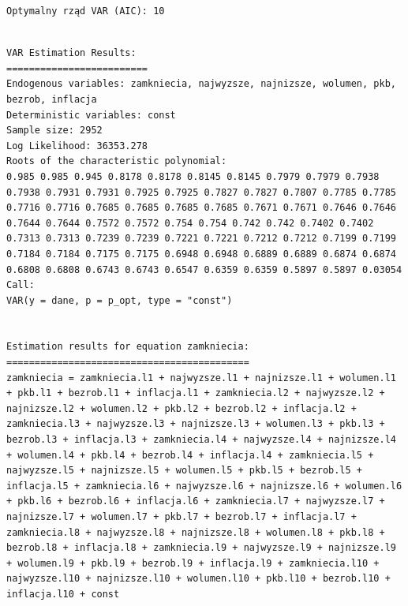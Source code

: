 \documentclass[
  polish,
  letterpaper,
  DIV=11,
  numbers=noendperiod]{scrartcl}
\newenvironment{Shaded}{\begin{snugshade}}{\end{snugshade}}
\newcommand{\FunctionTok}[1]{\textcolor[rgb]{0.28,0.35,0.67}{#1}}
\newcommand{\NormalTok}[1]{\textcolor[rgb]{0.00,0.23,0.31}{#1}}
\newcommand{\OtherTok}[1]{\textcolor[rgb]{0.00,0.23,0.31}{#1}}
\newcommand{\SpecialCharTok}[1]{\textcolor[rgb]{0.37,0.37,0.37}{#1}}
\begin{document}
\begin{verbatim}
Optymalny rząd VAR (AIC): 10 
\end{verbatim}

\begin{Shaded}
\end{Shaded}

\begin{verbatim}

VAR Estimation Results:
========================= 
Endogenous variables: zamkniecia, najwyzsze, najnizsze, wolumen, pkb, bezrob, inflacja 
Deterministic variables: const 
Sample size: 2952 
Log Likelihood: 36353.278 
Roots of the characteristic polynomial:
0.985 0.985 0.945 0.8178 0.8178 0.8145 0.8145 0.7979 0.7979 0.7938 0.7938 0.7931 0.7931 0.7925 0.7925 0.7827 0.7827 0.7807 0.7785 0.7785 0.7716 0.7716 0.7685 0.7685 0.7685 0.7685 0.7671 0.7671 0.7646 0.7646 0.7644 0.7644 0.7572 0.7572 0.754 0.754 0.742 0.742 0.7402 0.7402 0.7313 0.7313 0.7239 0.7239 0.7221 0.7221 0.7212 0.7212 0.7199 0.7199 0.7184 0.7184 0.7175 0.7175 0.6948 0.6948 0.6889 0.6889 0.6874 0.6874 0.6808 0.6808 0.6743 0.6743 0.6547 0.6359 0.6359 0.5897 0.5897 0.03054
Call:
VAR(y = dane, p = p_opt, type = "const")


Estimation results for equation zamkniecia: 
=========================================== 
zamkniecia = zamkniecia.l1 + najwyzsze.l1 + najnizsze.l1 + wolumen.l1 + pkb.l1 + bezrob.l1 + inflacja.l1 + zamkniecia.l2 + najwyzsze.l2 + najnizsze.l2 + wolumen.l2 + pkb.l2 + bezrob.l2 + inflacja.l2 + zamkniecia.l3 + najwyzsze.l3 + najnizsze.l3 + wolumen.l3 + pkb.l3 + bezrob.l3 + inflacja.l3 + zamkniecia.l4 + najwyzsze.l4 + najnizsze.l4 + wolumen.l4 + pkb.l4 + bezrob.l4 + inflacja.l4 + zamkniecia.l5 + najwyzsze.l5 + najnizsze.l5 + wolumen.l5 + pkb.l5 + bezrob.l5 + inflacja.l5 + zamkniecia.l6 + najwyzsze.l6 + najnizsze.l6 + wolumen.l6 + pkb.l6 + bezrob.l6 + inflacja.l6 + zamkniecia.l7 + najwyzsze.l7 + najnizsze.l7 + wolumen.l7 + pkb.l7 + bezrob.l7 + inflacja.l7 + zamkniecia.l8 + najwyzsze.l8 + najnizsze.l8 + wolumen.l8 + pkb.l8 + bezrob.l8 + inflacja.l8 + zamkniecia.l9 + najwyzsze.l9 + najnizsze.l9 + wolumen.l9 + pkb.l9 + bezrob.l9 + inflacja.l9 + zamkniecia.l10 + najwyzsze.l10 + najnizsze.l10 + wolumen.l10 + pkb.l10 + bezrob.l10 + inflacja.l10 + const 


\end{verbatim}
\end{document}
